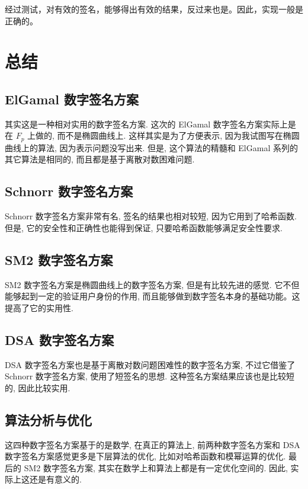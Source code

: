 \documentclass[12pt,a4paper]{article}
\begin{document}
经过测试，对有效的签名，能够得出有效的结果，反过来也是。因此，实现一般是正确的。

\section*{总结}

\subsection*{ElGamal 数字签名方案}

其实这是一种相对实用的数字签名方案. 这次的 ElGamal 数字签名方案实际上是在 $ F_p $ 上做的, 而不是椭圆曲线上. 这样其实是为了方便表示, 因为我试图写在椭圆曲线上的算法, 因为表示问题没写出来. 但是, 这个算法的精髓和 ElGamal 系列的其它算法是相同的, 而且都是基于离散对数困难问题. 

\subsection*{Schnorr 数字签名方案}

Schnorr 数字签名方案非常有名, 签名的结果也相对较短, 因为它用到了哈希函数. 但是, 它的安全性和正确性也能得到保证, 只要哈希函数能够满足安全性要求. 

\subsection*{SM2 数字签名方案}

SM2 数字签名方案是椭圆曲线上的数字签名方案, 但是有比较先进的感觉. 它不但能够起到一定的验证用户身份的作用, 而且能够做到数字签名本身的基础功能。这提高了它的实用性. 

\subsection*{DSA 数字签名方案}

DSA 数字签名方案也是基于离散对数问题困难性的数字签名方案, 不过它借鉴了 Schnorr 数字签名方案, 使用了短签名的思想. 这种签名方案结果应该也是比较短的, 因此比较实用. 

\subsection*{算法分析与优化}

这四种数字签名方案基于的是数学, 在真正的算法上, 前两种数字签名方案和 DSA 数字签名方案感觉更多是下层算法的优化, 比如对哈希函数和模幂运算的优化. 最后的 SM2 数字签名方案, 其实在数学上和算法上都是有一定优化空间的. 因此, 实际上这还是有意义的.  
\end{document}
